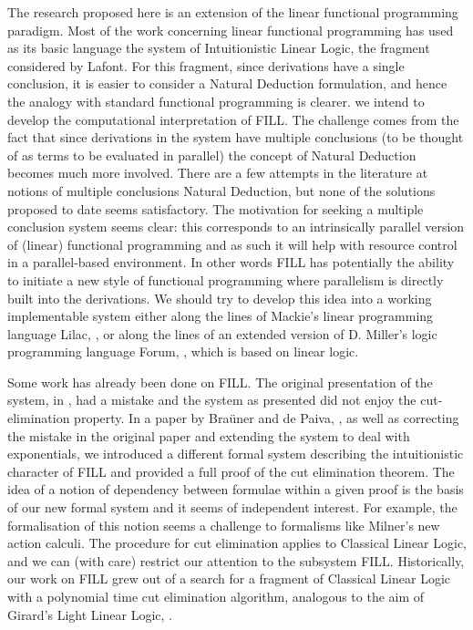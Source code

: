 {{The research proposed here is an extension of the linear functional programming 
paradigm. Most of the work concerning linear functional programming has used as 
its basic language the system of Intuitionistic Linear Logic, the fragment 
considered by Lafont. For this fragment, since derivations have a single 
conclusion, it is easier to consider a Natural Deduction formulation, and hence 
the analogy with standard functional programming is clearer. we intend to develop 
the computational interpretation of FILL. The challenge comes from the fact that 
since derivations in the system have multiple conclusions (to be thought of as 
terms to be evaluated in parallel) the concept of Natural Deduction becomes much 
more involved. There are a few attempts in the literature at notions of multiple 
conclusions Natural Deduction, but none of the solutions proposed to date seems 
satisfactory. The motivation for seeking a multiple conclusion system seems 
clear: this corresponds to an intrinsically parallel version of (linear) 
functional programming and as such it will help with resource control in a 
parallel-based environment. In other words FILL has potentially the ability 
to initiate a new style of functional programming where parallelism is directly 
built into the derivations. We should try to develop this idea into a working 
implementable system either along the lines of Mackie's linear programming 
language Lilac, \cite{Mackie91}, or along the lines of an extended version of 
D. Miller's logic programming language Forum, \cite{Miller94}, which is based 
on linear logic.

Some work has already been done on FILL. The original presentation of the system, 
in \cite{HylanddePaiva93}, had a mistake and the system as presented did not enjoy 
the cut-elimination property. In a paper by Bra\"{u}ner and de Paiva, 
\cite{BraunerdePaiva96}, as well as correcting the mistake in the original paper 
and extending the system to deal with exponentials, we introduced a different 
formal system describing the intuitionistic character of FILL and provided a full 
proof of the cut elimination theorem. The idea of a notion of dependency between 
formulae within a given proof is the basis of our new formal system and it seems 
of independent interest. For example, the formalisation of this notion seems a 
challenge to formalisms like Milner's new action calculi. The procedure for cut 
elimination applies to Classical Linear Logic, and we can (with care) restrict our 
attention to the subsystem FILL. Historically, our work on FILL grew out of a 
search for a fragment of Classical Linear Logic with a polynomial time cut 
elimination algorithm, analogous to the aim of Girard's Light Linear Logic, 
\cite{Girard94}. 

}}
